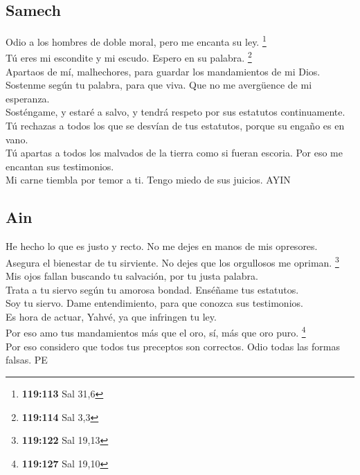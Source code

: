 \hypertarget{samech}{%
\subsection{Samech}\label{samech}}

 Odio a los hombres de doble moral, pero me encanta su
ley. \footnote{\textbf{119:113} Sal 31,6}\\
 Tú eres mi escondite y mi escudo. Espero en su palabra.
\footnote{\textbf{119:114} Sal 3,3}\\
 Apartaos de mí, malhechores, para guardar los
mandamientos de mi Dios.\\
 Sostenme según tu palabra, para que viva. Que no me
avergüence de mi esperanza.\\
 Sosténgame, y estaré a salvo, y tendrá respeto por sus
estatutos continuamente.\\
 Tú rechazas a todos los que se desvían de tus
estatutos, porque su engaño es en vano.\\
 Tú apartas a todos los malvados de la tierra como si
fueran escoria. Por eso me encantan sus testimonios.\\
 Mi carne tiembla por temor a ti. Tengo miedo de sus
juicios. AYIN

\hypertarget{ain}{%
\subsection{Ain}\label{ain}}

 He hecho lo que es justo y recto. No me dejes en manos
de mis opresores.\\
 Asegura el bienestar de tu sirviente. No dejes que los
orgullosos me opriman. \footnote{\textbf{119:122} Sal 19,13}\\
 Mis ojos fallan buscando tu salvación, por tu justa
palabra.\\
 Trata a tu siervo según tu amorosa bondad. Enséñame tus
estatutos.\\
 Soy tu siervo. Dame entendimiento, para que conozca sus
testimonios.\\
 Es hora de actuar, Yahvé, ya que infringen tu ley.\\
 Por eso amo tus mandamientos más que el oro, sí, más
que oro puro. \footnote{\textbf{119:127} Sal 19,10}\\
 Por eso considero que todos tus preceptos son
correctos. Odio todas las formas falsas. PE

